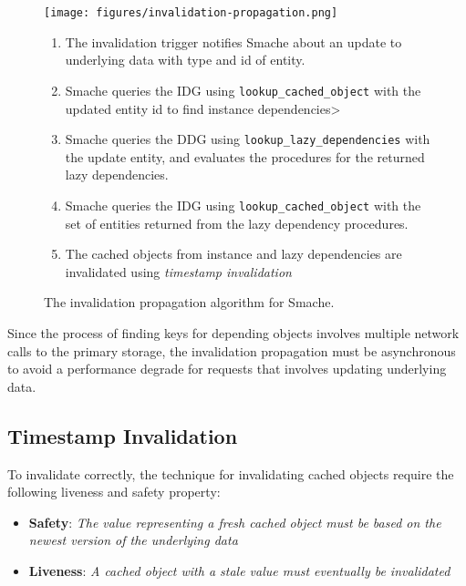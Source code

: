 \begin{figure*}[ht!]
  \centering
  \texttt{[image: figures/invalidation-propagation.png]}
  \begin{enumerate}
    \item The invalidation trigger notifies Smache about an update to underlying data with type and id of entity.
    \item Smache queries the IDG using \verb$lookup_cached_object$ with the updated entity id to find instance dependencies>
    \item Smache queries the DDG using \verb$lookup_lazy_dependencies$ with the update entity, and evaluates the procedures for the returned lazy dependencies.
    \item Smache queries the IDG using \verb$lookup_cached_object$ with the set of entities returned from the lazy dependency procedures.
    \item The cached objects from instance and lazy dependencies are invalidated using \emph{timestamp invalidation}
  \end{enumerate}
  \caption{The invalidation propagation algorithm for Smache.}
  \label{fig:invalidation-propagation}
\end{figure*}

Since the process of finding keys for depending objects involves multiple network calls to the primary storage, the invalidation propagation must be asynchronous to avoid a performance degrade for requests that involves updating underlying data.


\subsection{Timestamp Invalidation}
\label{subsec:timestamp-invalidation}

To invalidate correctly, the technique for invalidating cached objects require the following liveness and safety property:

\begin{itemize}
  \item \textbf{Safety}: \emph{The value representing a fresh cached object must be based on the newest version of the underlying data}
  \item \textbf{Liveness}: \emph{A cached object with a stale value must eventually be invalidated}
\end{itemize}

